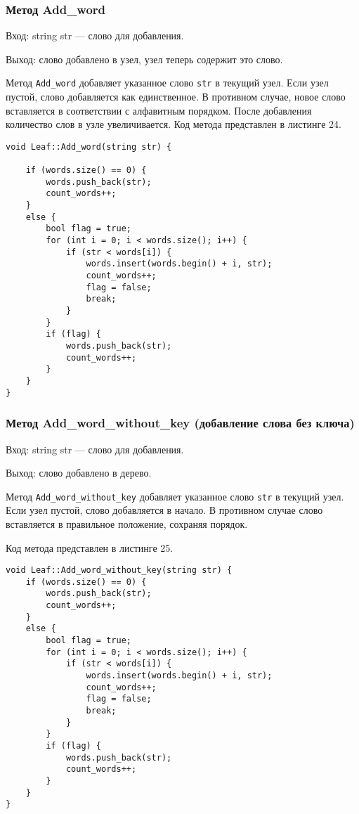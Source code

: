 \documentclass[10pt,a4paper,final]{article} %
\begin{document}
\subsubsection{Метод Add\_word }
Вход: string str — слово для добавления. \par
Выход: слово добавлено в узел, узел теперь содержит это слово. \par
\par Метод \texttt{Add\_word} добавляет указанное слово \texttt{str} в текущий узел. Если узел пустой, слово добавляется как единственное. В противном случае, новое слово вставляется в соответствии с алфавитным порядком. После добавления количество слов в узле увеличивается.
Код метода представлен в листинге 24. \begin{lstlisting}[label=addWordLeafMethod, caption = Метод Add\_word (в классе Leaf)] 
void Leaf::Add_word(string str) {
	
	if (words.size() == 0) {
		words.push_back(str);
		count_words++;
	}
	else {
		bool flag = true;
		for (int i = 0; i < words.size(); i++) {
			if (str < words[i]) {
				words.insert(words.begin() + i, str);
				count_words++;
				flag = false;
				break;
			}
		}
		if (flag) {
			words.push_back(str);
			count_words++;
		}
	}
}\end{lstlisting}


\subsubsection{Метод Add\_word\_without\_key (добавление слова без ключа)} 
Вход: string str — слово для добавления. \par 
Выход: слово добавлено в дерево. \par 
\par Метод \texttt{Add\_word\_without\_key} добавляет указанное слово \texttt{str} в текущий узел. Если узел пустой, слово добавляется в начало. В противном случае слово вставляется в правильное положение, сохраняя порядок.

Код метода представлен в листинге 25. \begin{lstlisting}[label=addWordWithoutKeyMethodLeaf, caption = Метод Add\_word\_without\_key (добавление слова без ключа)]
void Leaf::Add_word_without_key(string str) {
	if (words.size() == 0) {
		words.push_back(str);
		count_words++;
	}
	else {
		bool flag = true;
		for (int i = 0; i < words.size(); i++) {
			if (str < words[i]) {
				words.insert(words.begin() + i, str);
				count_words++;
				flag = false;
				break;
			}
		}
		if (flag) {
			words.push_back(str);
			count_words++;
		}
	}
} \end{lstlisting}
\end{document}
